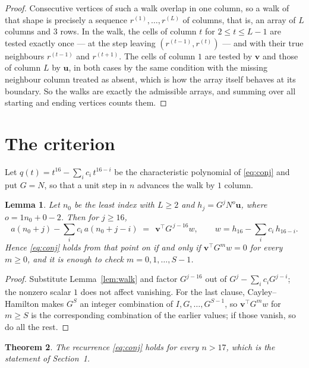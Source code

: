 \documentclass[11pt,a4paper]{article}
\theoremstyle{plain}
\newtheorem{theorem}{Theorem}
\newtheorem{lemma}[theorem]{Lemma}
\theoremstyle{definition}
\begin{document}
\begin{proof}
Consecutive vertices of such a walk overlap in one column, so a walk of that shape is
precisely a sequence $r^{(1)},\dots,r^{(L)}$ of columns, that is, an array of $L$ columns
and $3$ rows. In the walk, the cells of column $t$ for $2\le t\le L-1$ are tested
exactly once --- at the step leaving $(r^{(t-1)},r^{(t)})$ --- and with their true
neighbours $r^{(t-1)}$ and $r^{(t+1)}$. The cells of column $1$ are tested by
$\mathbf{v}$ and those of column $L$ by $\mathbf{u}$, in both cases by the same condition
with the missing neighbour column treated as absent, which is how the array itself behaves at
its boundary. So the walks are exactly the admissible arrays, and summing over all starting
and ending vertices counts them.
\end{proof}

\section{The criterion}

Let $q(t)=t^{16}-\sum_i c_i\,t^{16-i}$ be the characteristic polynomial of
\eqref{eq:conj} and put $G=N$, so that a unit step in $n$ advances the walk by
$1$ column.

\begin{lemma}\label{lem:crit}
Let $n_0$ be the least index with $L\ge2$ and $h_j=G^{j}N^{o}\mathbf{u}$, where
$o=1n_0+0-2$. Then for $j\ge16$,
\[
a(n_0+j)-\sum_i c_i\,a(n_0+j-i)\;=\;\,\mathbf{v}^{\!\top}G^{\,j-16}w,
\qquad w=h_{16}-\sum_i c_i\,h_{16-i} .
\]
Hence \eqref{eq:conj} holds from that point on if and only if
$\mathbf{v}^{\!\top}G^{m}w=0$ for every $m\ge0$, and it is enough to check
$m=0,1,\dots,S-1$.
\end{lemma}

\begin{proof}
Substitute Lemma~\ref{lem:walk} and factor $G^{j-16}$ out of
$G^{j}-\sum_ic_iG^{j-i}$; the nonzero scalar $1$ does not affect
vanishing. For the last clause, Cayley--Hamilton makes $G^{S}$ an integer combination of
$I,G,\dots,G^{S-1}$, so $\mathbf{v}^{\!\top}G^{m}w$ for $m\ge S$ is the corresponding
combination of the earlier values; if those vanish, so do all the rest.
\end{proof}

\begin{theorem}
The recurrence \eqref{eq:conj} holds for every $n>17$, which is the statement of
Section~1.
\end{theorem}
\end{document}
